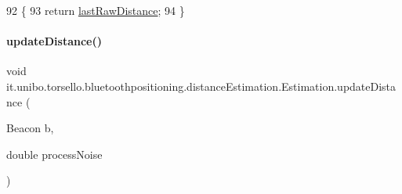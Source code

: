 \begin{DoxyCode}
92                                    \{
93         \textcolor{keywordflow}{return} \hyperlink{classit_1_1unibo_1_1torsello_1_1bluetoothpositioning_1_1distanceEstimation_1_1Estimation_aca258dd3fd097b8ae575725327bb7fad_aca258dd3fd097b8ae575725327bb7fad}{lastRawDistance};
94     \}
\end{DoxyCode}
\hypertarget{classit_1_1unibo_1_1torsello_1_1bluetoothpositioning_1_1distanceEstimation_1_1Estimation_aaf86439861db7facf3f5338ec2fc6cde_aaf86439861db7facf3f5338ec2fc6cde}{}\label{classit_1_1unibo_1_1torsello_1_1bluetoothpositioning_1_1distanceEstimation_1_1Estimation_aaf86439861db7facf3f5338ec2fc6cde_aaf86439861db7facf3f5338ec2fc6cde} 
\paragraph{\texorpdfstring{update\+Distance()}{updateDistance()}}
{\footnotesize\ttfamily void it.\+unibo.\+torsello.\+bluetoothpositioning.\+distance\+Estimation.\+Estimation.\+update\+Distance (\begin{DoxyParamCaption}\item[{Beacon}]{b,  }\item[{double}]{process\+Noise }\end{DoxyParamCaption})}


